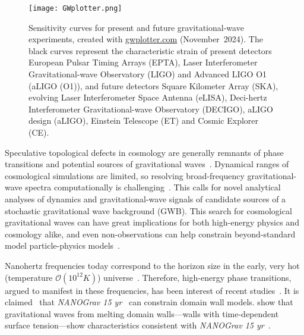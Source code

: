 \begin{figure}[hb]
    \centering
    \texttt{[image: GWplotter.png]}
    \caption{Sensitivity curves for present and future gravitational-wave experiments, created with \href{http://www.sr.bham.ac.uk/~cplb/GWplotter/}{\textsf{gwplotter.com}} (November~2024). The black curves represent the characteristic strain of present detectors European Pulsar Timing Arrays (EPTA), Laser Interferometer Gravitational-wave Observatory (LIGO) and Advanced LIGO O1 (aLIGO (O1)), and future detectors Square Kilometer Array (SKA), evolving Laser Interferometer Space Antenna (eLISA), Deci-hertz Interferometer Gravitational-wave Observatory (DECIGO), aLIGO design (aLIGO), Einstein Telescope (ET) and Cosmic Explorer (CE).}
    \label{fig:intro:GWplotter}
\end{figure}


Speculative topological defects in cosmology are generally remnants of phase transitions and potential sources of gravitational waves~\citep{christiansenGravitationalWavesDark2024,saikawaReviewGravitationalWaves2017}. Dynamical ranges of cosmological simulations are limited, so resolving broad-frequency gravitational-wave spectra computationally is challenging~\citep{saikawaReviewGravitationalWaves2017}. This calls for novel analytical analyses of dynamics and gravitational-wave signals of candidate sources of a stochastic gravitational wave background (GWB). This search for cosmological gravitational waves can have great implications for both high-energy physics and cosmology alike, and even non-observations can help constrain beyond-standard model particle-physics models~\citep{kawasakiStudyGravitationalRadiation2011}.


Nanohertz frequencies today correspond to the horizon size in the early, very hot (temperature $\mathscr{O}(10^{12}\unit{K})$) universe~\citep{christiansenGravitationalWavesDark2024}. Therefore, high-energy phase transitions, argued to manifest in these frequencies, has been interest of recent studies~\citep{babichevNANOGravSpectralIndex2023,saikawaReviewGravitationalWaves2017,liProbingHighTemperature2023}. It is claimed~\citep{afzalNANOGrav15Yr2023} that \textit{NANOGrav 15 yr}~\cite{agazieNANOGrav15Yr2023a} can constrain domain wall models.  show that gravitational waves from melting domain walls---walls with time-dependent surface tension---show characteristics consistent with \textit{NANOGrav 15 yr}~\cite{agazieNANOGrav15Yr2023a}.  


